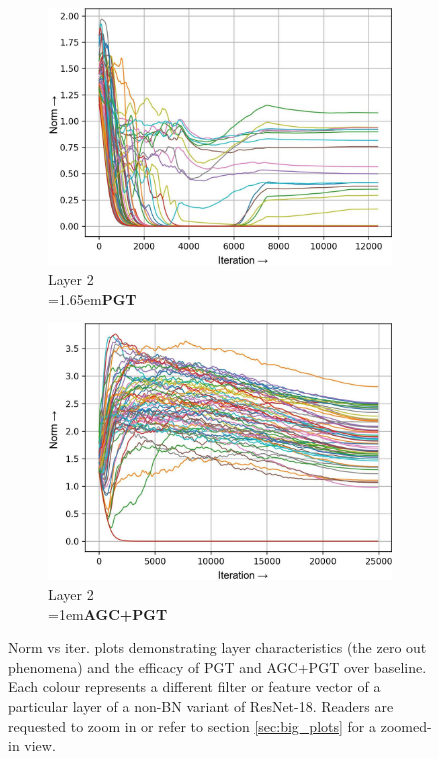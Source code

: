 \documentclass[runningheads]{llncs}
\newcommand{\forceindenta}{\parindent=1em\indent\parindent=0pt\relax}
\newcommand{\forceindentb}{\parindent=1.65em\indent\parindent=0pt\relax}
\begin{document}
\begin{figure}[t]
\begin{subfigure}[t]{0.16\textwidth}
\includegraphics[width=\textwidth]{trimmed/pgt-w-layer-1-2}
\caption{Layer 2\\ \forceindentb\textbf{PGT}}
\end{subfigure}
\begin{subfigure}[t]{0.16\textwidth}
\includegraphics[width=\textwidth]{trimmed/agc_pgt-w-layer-1-2}
\caption{Layer 2\\ \forceindenta\textbf{AGC+PGT}}
\end{subfigure}
\captionsetup{font=normalsize}
\caption{ Norm vs iter. plots demonstrating layer characteristics (the zero out
phenomena) and the efficacy of PGT and AGC+PGT over baseline. Each colour represents a
different filter or feature vector of a particular layer of a non-BN variant of
ResNet-18. Readers are requested to zoom in or refer to section \ref{sec:big_plots} for
a zoomed-in view. }
\label{fig:norm_plots}
\vspace{-0.5cm}
\end{figure}
\end{document}
